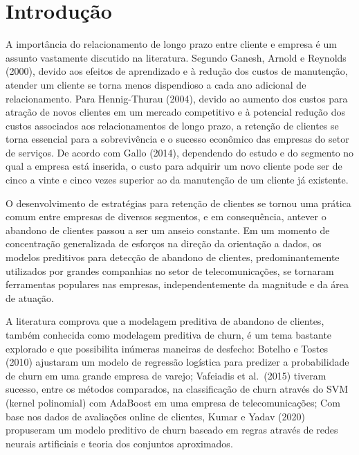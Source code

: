 \documentclass[twocolumn]{rbef}
\newcommand{\1}{\mathbbm{1}}
\begin{document}
\hypertarget{introduuxe7uxe3o}{%
\section{Introdução}\label{introduuxe7uxe3o}}

A importância do relacionamento de longo prazo entre cliente e empresa é um assunto vastamente discutido na literatura. Segundo Ganesh, Arnold e Reynolds (2000), devido aos efeitos de aprendizado e à redução dos custos de manutenção, atender um cliente se torna menos dispendioso a cada ano adicional de relacionamento. Para Hennig-Thurau (2004), devido ao aumento dos custos para atração de novos clientes em um mercado competitivo e à potencial redução dos custos associados aos relacionamentos de longo prazo, a retenção de clientes se torna essencial para a sobrevivência e o sucesso econômico das empresas do setor de serviços. De acordo com Gallo (2014), dependendo do estudo e do segmento no qual a empresa está inserida, o custo para adquirir um novo cliente pode ser de cinco a vinte e cinco vezes superior ao da manutenção de um cliente já existente.

O desenvolvimento de estratégias para retenção de clientes se tornou uma prática comum entre empresas de diversos segmentos, e em consequência, antever o abandono de clientes passou a ser um anseio constante. Em um momento de concentração generalizada de esforços na direção da orientação a dados, os modelos preditivos para detecção de abandono de clientes, predominantemente utilizados por grandes companhias no setor de telecomunicações, se tornaram ferramentas populares nas empresas, independentemente da magnitude e da área de atuação.

A literatura comprova que a modelagem preditiva de abandono de clientes, também conhecida como modelagem preditiva de churn, é um tema bastante explorado e que possibilita inúmeras maneiras de desfecho: Botelho e Tostes (2010) ajustaram um modelo de regressão logística para predizer a probabilidade de churn em uma grande empresa de varejo; Vafeiadis et al.~(2015) tiveram sucesso, entre os métodos comparados, na classificação de churn através do SVM (kernel polinomial) com AdaBoost em uma empresa de telecomunicações; Com base nos dados de avaliações online de clientes, Kumar e Yadav (2020) propuseram um modelo preditivo de churn baseado em regras através de redes neurais artificiais e teoria dos conjuntos aproximados.
\end{document}
